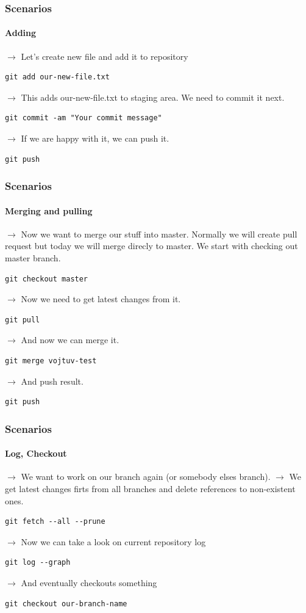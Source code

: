 \documentclass[aspectratio=169]{beamer}
\begin{document}
    \begin{frame}[fragile]
        \frametitle{Scenarios}
        \framesubtitle{Adding}
        $\rightarrow$ Let's create new file and add it to repository
        \begin{lstlisting}[gobble=12]
            git add our-new-file.txt
        \end{lstlisting}
        $\rightarrow$ This adds our-new-file.txt to staging area. We need to commit it next.
        \begin{lstlisting}[gobble=12]
            git commit -am "Your commit message"
        \end{lstlisting}
        $\rightarrow$ If we are happy with it, we can push it.
        \begin{lstlisting}[gobble=12]
            git push
        \end{lstlisting}
    \end{frame}
    \begin{frame}[fragile]
        \frametitle{Scenarios}
        \framesubtitle{Merging and pulling}
        $\rightarrow$ Now we want to merge our stuff into master. Normally we will create pull request but today we will merge direcly to master. We start with checking out master branch.
        \begin{lstlisting}[gobble=12]
            git checkout master
        \end{lstlisting}
        $\rightarrow$ Now we need to get latest changes from it.
        \begin{lstlisting}[gobble=12]
            git pull
        \end{lstlisting}
        $\rightarrow$ And now we can merge it.
        \begin{lstlisting}[gobble=12]
            git merge vojtuv-test
        \end{lstlisting}
        $\rightarrow$ And push result.
        \begin{lstlisting}[gobble=12]
            git push
        \end{lstlisting}
    \end{frame}
    \begin{frame}[fragile]
        \frametitle{Scenarios}
        \framesubtitle{Log, Checkout}
        $\rightarrow$ We want to work on our branch again (or somebody elses branch).\newline
        $\rightarrow$ We get latest changes firts from all branches and delete references to non-existent ones.
        \begin{lstlisting}[gobble=12]
            git fetch --all --prune
        \end{lstlisting}
        $\rightarrow$ Now we can take a look on current repository log
        \begin{lstlisting}[gobble=12]
            git log --graph
        \end{lstlisting}
        $\rightarrow$ And eventually checkouts something
        \begin{lstlisting}[gobble=12]
            git checkout our-branch-name
        \end{lstlisting}
    \end{frame}
\end{document}

